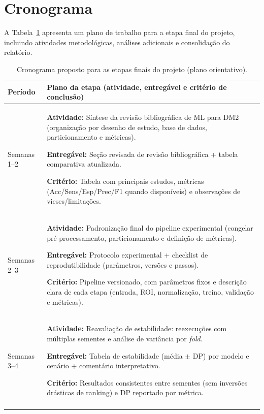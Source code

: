 \documentclass[12pt,a4paper]{article}
\begin{document}
\section{Cronograma}

A Tabela~\ref{tab:cronograma} apresenta um plano de trabalho para a etapa final do
projeto, incluindo atividades metodológicas, análises adicionais e consolidação do relatório.

\begin{table}[htbp]
\centering
\caption{Cronograma proposto para as etapas finais do projeto (plano orientativo).}
\label{tab:cronograma}
\small
\setlength{\tabcolsep}{6pt}
\renewcommand{\arraystretch}{1.25}
\begin{tabularx}{\textwidth}{p{} >{\raggedright\arraybackslash}X}
\toprule
\textbf{Período} & \textbf{Plano da etapa (atividade, entregável e critério de conclusão)} \\
\midrule

Semanas 1--2 &
\textbf{Atividade:} Síntese da revisão bibliográfica de ML para DM2 (organização por desenho de estudo, base de dados, particionamento e métricas). \par
\textbf{Entregável:} Seção revisada de revisão bibliográfica + tabela comparativa atualizada. \par
\textbf{Critério:} Tabela com principais estudos, métricas (Acc/Sens/Esp/Prec/F1 quando disponíveis) e observações de vieses/limitações. \\
\addlinespace[8pt]

Semanas 2--3 &
\textbf{Atividade:} Padronização final do pipeline experimental (congelar pré-processamento, particionamento e definição de métricas). \par
\textbf{Entregável:} Protocolo experimental + checklist de reprodutibilidade (parâmetros, versões e passos). \par
\textbf{Critério:} Pipeline versionado, com parâmetros fixos e descrição clara de cada etapa (entrada, ROI, normalização, treino, validação e métricas). \\
\addlinespace[8pt]

Semanas 3--4 &
\textbf{Atividade:} Reavaliação de estabilidade: reexecuções com múltiplas sementes e análise de variância por \textit{fold}. \par
\textbf{Entregável:} Tabela de estabilidade (média $\pm$ DP) por modelo e cenário + comentário interpretativo. \par
\textbf{Critério:} Resultados consistentes entre sementes (sem inversões drásticas de ranking) e DP reportado por métrica. \\
\addlinespace[8pt]


\end{tabularx}
\end{table}
\end{document}
